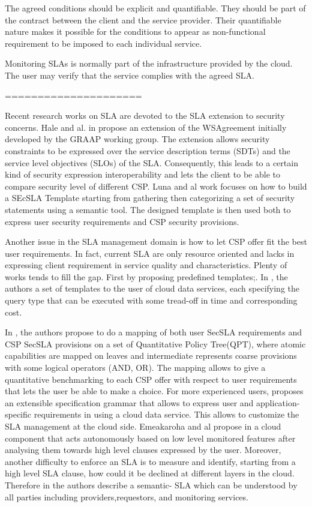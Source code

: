 The agreed conditions should be explicit and quantifiable.
They should be part of the contract between the client and the service provider.
Their quantifiable nature makes it possible for the conditions to appear as non-functional requirement to be imposed to each individual service.

Monitoring SLAs is normally part of the infrastructure provided by the cloud.
The user may verify that the service complies with the agreed SLA.



=====================

Recent research works on SLA are devoted to the SLA extension to security concerns. Hale
and al. in \cite{6274042} propose an extension of the WSAgreement initially developed by the GRAAP
working group. The extension allows security constraints to be expressed over the service description
terms (SDTs) and the service level objectives (SLOs) of the SLA. Consequently, this leads to a certain kind of security expression interoperability and lets the client to be able to compare security level of different CSP. Luna and al
work \cite{LunaGarcia:2012:BCS:2381913.2381932} focuses on how to build a SEcSLA Template starting from gathering then categorizing a set of security statements using a semantic tool. The designed template is then used both to express user security requirements and CSP security provisions.

Another issue in the SLA management domain is how to let CSP offer fit the best user requirements. In fact, current SLA are only resource oriented and lacks in expressing client requirement in service quality and characteristics. Plenty of works tends to fill the gap. First by proposing predefined templates;. In \cite{Ortiz:2013:VPS:2486767.2486772}, the authors
  a set of templates to the user of cloud data services, each specifying the query type that can be executed with some tread-off in time and corresponding cost. 
  
  In \cite{LunaGarcia:2012:BCS:2381913.2381932,}, the authors propose to do a mapping of both user SecSLA requirements and CSP SecSLA provisions on a set of Quantitative Policy Tree(QPT), where atomic capabilities are mapped on leaves and intermediate represents coarse provisions with some logical operators (AND, OR). The mapping allows to give a quantitative benchmarking to each CSP offer with respect to user requirements that lets the user be able to make a choice. For more experienced users, \cite{6313668} proposes an extensible specification grammar that allows to express user and application-specific requirements in using a cloud data service. This allows to customize the SLA management at the cloud side. Emeakaroha and al propose in \cite{5547150}  a cloud component that acts autonomously based on low level monitored features after analysing them towards high level clauses expressed by the user. Moreover, another difficulty to enforce an SLA is to measure and identify, starting from a high level SLA clause, how could it be declined at different layers in the cloud. Therefore in  \cite{Dastjerdi:2012:DOA:2275356.2275360}  the authors describe a semantic- SLA which can be understood by all parties including providers,requestors, and monitoring services. 
  
